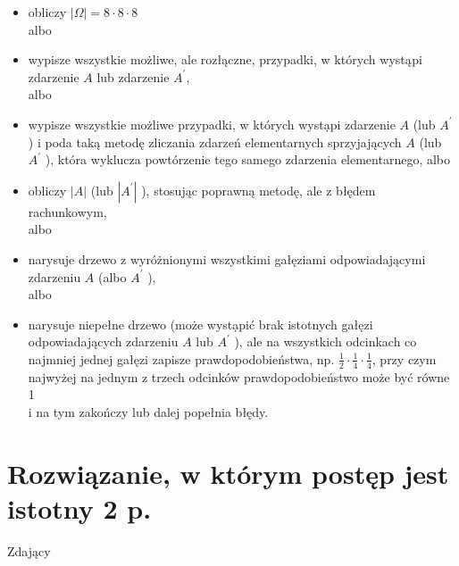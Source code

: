 \documentclass[10pt]{article}
\begin{document}
\begin{itemize}
  \item obliczy $|\Omega|=8 \cdot 8 \cdot 8$\\
albo
  \item wypisze wszystkie możliwe, ale rozłączne, przypadki, w których wystąpi zdarzenie $A$ lub zdarzenie $A^{\prime}$,\\
albo
  \item wypisze wszystkie możliwe przypadki, w których wystạpi zdarzenie $A$ (lub $A^{\prime}$ ) i poda taką metodę zliczania zdarzeń elementarnych sprzyjających $A$ (lub $A^{\prime}$ ), która wyklucza powtórzenie tego samego zdarzenia elementarnego, albo
  \item obliczy $|A|$ (lub $\left|A^{\prime}\right|$ ), stosując poprawną metodę, ale z błędem rachunkowym,\\
albo
  \item narysuje drzewo z wyróżnionymi wszystkimi gałęziami odpowiadającymi zdarzeniu $A$ (albo $A^{\prime}$ ),\\
albo
  \item narysuje niepełne drzewo (może wystạpić brak istotnych gałęzi odpowiadających zdarzeniu $A$ lub $A^{\prime}$ ), ale na wszystkich odcinkach co najmniej jednej gałęzi zapisze prawdopodobieństwa, np. $\frac{1}{2} \cdot \frac{1}{4} \cdot \frac{1}{4}$, przy czym najwyżej na jednym z trzech odcinków prawdopodobieństwo może być równe 1\\
i na tym zakończy lub dalej popełnia błędy.
\end{itemize}

\section*{Rozwiązanie, w którym postęp jest istotny 2 p.}
Zdający
\end{document}
